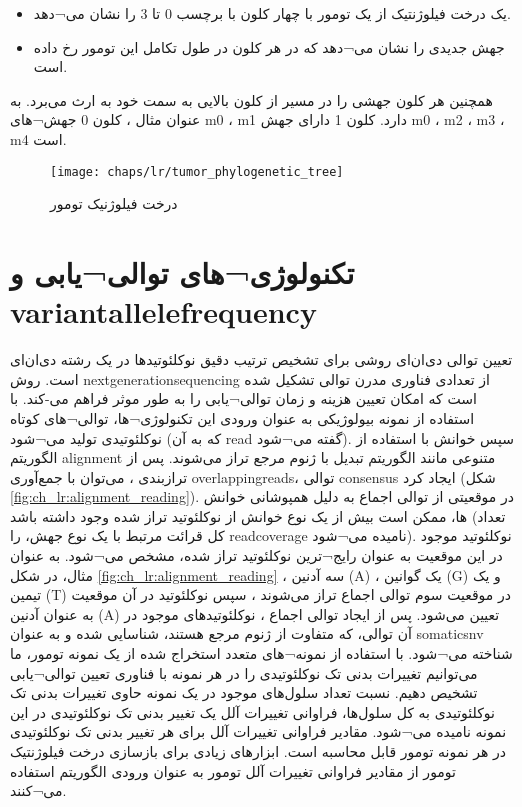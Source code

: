 \begin{itemize}
	\item یک درخت فیلوژنتیک از یک تومور با چهار کلون با برچسب 0 تا 3  را نشان می¬دهد.
	\item جهش جدیدی را نشان می¬دهد که در هر کلون در طول تکامل این تومور رخ داده است.
\end{itemize}

 همچنین هر کلون جهشی را در مسیر از کلون بالایی به سمت خود به ارث می‌برد. به عنوان مثال ، کلون 0 جهش¬های m0 ، m1 دارد. کلون 1 دارای جهش m0 ، m2 ، m3 ، m4 است.
 
\begin{figure}[!ht]
	\centerline{\texttt{[image: chaps/lr/tumor\_phylogenetic\_tree]}}
	\caption{درخت فیلوژنیک تومور}
	\label{fig:ch_lr:tumor_phylogenetic_tree}
\end{figure}


\section{تکنولوژی¬های توالی¬یابی و \gls{variantallelefrequency}}




تعیین توالی دی‌ان‌ای روشی برای تشخیص ترتیب دقیق نوکلئوتیدها در یک رشته دی‌ان‌ای است. روش \gls{nextgenerationsequencing}  از تعدادی فناوری مدرن توالی تشکیل شده است که امکان تعیین هزینه و زمان توالی¬یابی را به طور موثر فراهم می-کند. با استفاده از نمونه بیولوژیکی به عنوان ورودی این تکنولوژی¬ها، توالی¬های کوتاه نوکلئوتیدی تولید می¬شود (که به آن \gls{read}  گفته می¬شود). سپس خوانش با استفاده از الگوریتم \gls{alignment}  متنوعی مانند الگوریتم تبدیل  با ژنوم مرجع تراز می‌شوند. پس از ترازبندی ، می‌توان با جمع‌آوری \glspl{overlappingread}،  توالی \gls{consensus}  ایجاد کرد (شکل \ref{fig:ch_lr:alignment_reading}). در موقعیتی از توالی اجماع به دلیل همپوشانی خوانش ها، ممکن است بیش از یک نوع خوانش از نوکلئوتید تراز شده وجود داشته باشد (تعداد کل قرائت مرتبط با یک نوع جهش، را \gls{readcoverage}  نامیده می¬شود). نوکلئوتید موجود در این موقعیت به عنوان رایج¬ترین نوکلئوتید تراز شده، مشخص می¬شود. به عنوان مثال، در شکل \ref{fig:ch_lr:alignment_reading} ، سه آدنین (A) ، یک گوانین (G) و یک تیمین (T)  در موقعیت سوم توالی اجماع تراز می‌شوند ، سپس نوکلئوتید در آن موقعیت به عنوان آدنین (A) تعیین می‌شود. پس از ایجاد توالی اجماع ، نوکلئوتیدهای موجود در آن توالی، که متفاوت از ژنوم مرجع هستند، شناسایی شده و به عنوان \gls{somaticsnv}  شناخته می¬شود. با استفاده از نمونه¬های متعدد استخراج شده از یک نمونه تومور، ما می‌توانیم تغییرات بدنی تک نوکلئوتیدی را در هر نمونه با فناوری تعیین توالی¬یابی تشخیص دهیم. نسبت تعداد سلول‌های موجود در یک نمونه حاوی تغییرات بدنی تک نوکلئوتیدی به کل سلول‌ها، فراوانی تغییرات آلل یک تغییر بدنی تک نوکلئوتیدی در این نمونه نامیده می¬شود. مقادیر فراوانی تغییرات آلل برای هر تغییر بدنی تک نوکلئوتیدی  در هر نمونه تومور قابل محاسبه است. ابزارهای زیادی برای بازسازی درخت فیلوژنتیک تومور از مقادیر فراوانی تغییرات آلل تومور به عنوان ورودی الگوریتم استفاده می¬کنند.



